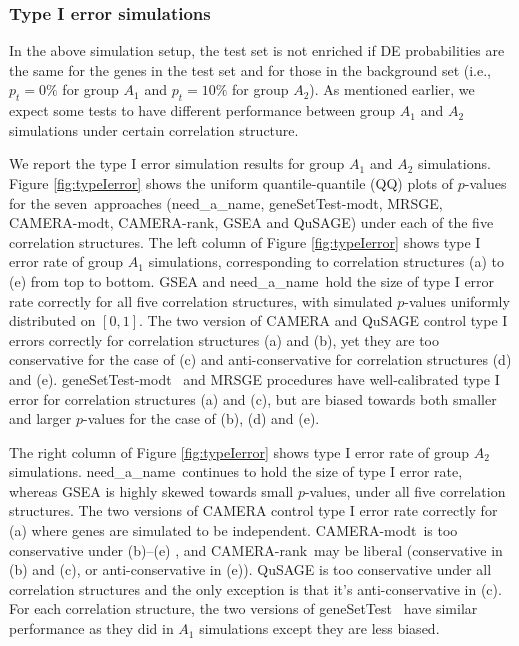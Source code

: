 \documentclass[useAMS,usenatbib, galley]{biom}
\newcommand{\OurMethod}{need\_a\_name}
\newcommand{\aaCase}{a}
\newcommand{\aCase}{b}
\newcommand{\cCase}{c}
\newcommand{\eCase}{d}
\newcommand{\fCase}{e}
\newcommand{\CMR}{CAMERA-rank}
\newcommand{\CMT}{CAMERA-modt}
\newcommand{\gent}{geneSetTest-modt}
\newcommand{\gen}{geneSetTest}
\begin{document}
	\subsubsection{Type I error simulations}\label{subsection:typeIerror}
	
	In the above simulation setup, the test set is not enriched if DE probabilities are the same for the genes in the test set and for those in the background set (i.e., $p_t =0\%$ for group $A_1$ and $p_t = 10\%$ for group $A_2$). As mentioned earlier, we expect some tests to have different performance between group $A_1$ and $A_2$ simulations under certain correlation structure. 
	
	We report the type I error simulation results for group $A_1$ and $A_2$ simulations. Figure \ref{fig:typeIerror} shows the uniform quantile-quantile (QQ) plots of $p$-values for the seven~approaches (\OurMethod, \gent, MRSGE, \CMT, \CMR, GSEA and QuSAGE) under each of the five correlation structures. The left column of Figure \ref{fig:typeIerror} shows type I error rate of group $A_1$ simulations, corresponding to correlation structures (\aaCase) to (\fCase) from top to bottom. GSEA and \OurMethod~hold the size of type I error rate correctly for all five correlation structures, with simulated $p$-values uniformly distributed on $[0, 1]$. The two version of CAMERA and QuSAGE control type I errors correctly for correlation structures (\aaCase) and (\aCase), yet they are too conservative for the case of (\cCase) and anti-conservative for correlation structures (\eCase) and (\fCase). \gent~ and MRSGE procedures have well-calibrated type I error for correlation structures (\aaCase) and (\cCase), but are biased towards both smaller and larger $p$-values for the case of (\aCase), (\eCase) and (\fCase). 
	
	The right column of Figure \ref{fig:typeIerror} shows type I error rate of group $A_2$ simulations. \OurMethod~continues to hold the size of type I error rate, whereas GSEA is highly skewed towards small $p$-values, under all five correlation structures. The two versions of CAMERA control type I error rate correctly for (\aaCase) where genes are simulated to be independent. \CMT~is too conservative under (\aCase)--(\fCase) , and \CMR~may be liberal (conservative in (\aCase) and (\cCase), or anti-conservative in (\fCase)). QuSAGE is too conservative under all correlation structures and the only exception is that it's anti-conservative in (\cCase). For each correlation structure, the two versions of \gen~ have similar performance as they did in $A_1$ simulations except they are less biased.
	
\end{document}

